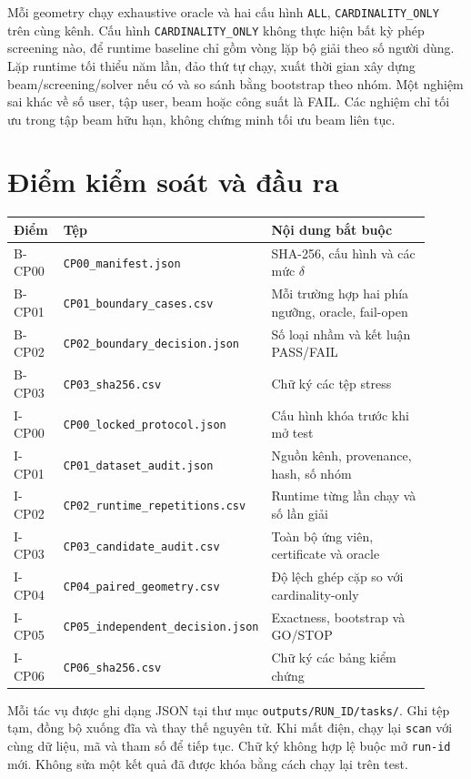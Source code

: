 \documentclass[11pt,onecolumn]{IEEEtran}
\begin{document}
Mỗi geometry chạy exhaustive oracle và hai cấu hình \texttt{ALL}, \texttt{CARDINALITY\_ONLY} trên cùng kênh. Cấu hình \texttt{CARDINALITY\_ONLY} không thực hiện bất kỳ phép screening nào, để runtime baseline chỉ gồm vòng lặp bộ giải theo số người dùng. Lặp runtime tối thiểu năm lần, đảo thứ tự chạy, xuất thời gian xây dựng beam/screening/solver nếu có và so sánh bằng bootstrap theo nhóm. Một nghiệm sai khác về số user, tập user, beam hoặc công suất là FAIL. Các nghiệm chỉ tối ưu trong tập beam hữu hạn, không chứng minh tối ưu beam liên tục.

\section{Điểm kiểm soát và đầu ra}
\begin{longtable}{p{0.12\linewidth}p{0.39\linewidth}p{0.40\linewidth}}
\toprule
Điểm & Tệp & Nội dung bắt buộc\\\midrule
\endhead
B-CP00 & \texttt{CP00\_manifest.json} & SHA-256, cấu hình và các mức $\delta$\\
B-CP01 & \texttt{CP01\_boundary\_cases.csv} & Mỗi trường hợp hai phía ngưỡng, oracle, fail-open\\
B-CP02 & \texttt{CP02\_boundary\_decision.json} & Số loại nhầm và kết luận PASS/FAIL\\
B-CP03 & \texttt{CP03\_sha256.csv} & Chữ ký các tệp stress\\
I-CP00 & \texttt{CP00\_locked\_protocol.json} & Cấu hình khóa trước khi mở test\\
I-CP01 & \texttt{CP01\_dataset\_audit.json} & Nguồn kênh, provenance, hash, số nhóm\\
I-CP02 & \texttt{CP02\_runtime\_repetitions.csv} & Runtime từng lần chạy và số lần giải\\
I-CP03 & \texttt{CP03\_candidate\_audit.csv} & Toàn bộ ứng viên, certificate và oracle\\
I-CP04 & \texttt{CP04\_paired\_geometry.csv} & Độ lệch ghép cặp so với cardinality-only\\
I-CP05 & \texttt{CP05\_independent\_decision.json} & Exactness, bootstrap và GO/STOP\\
I-CP06 & \texttt{CP06\_sha256.csv} & Chữ ký các bảng kiểm chứng\\\bottomrule
\end{longtable}

Mỗi tác vụ được ghi dạng JSON tại thư mục \texttt{outputs/RUN\_ID/tasks/}. Ghi tệp tạm, đồng bộ xuống đĩa và thay thế nguyên tử. Khi mất điện, chạy lại \texttt{scan} với cùng dữ liệu, mã và tham số để tiếp tục. Chữ ký không hợp lệ buộc mở \texttt{run-id} mới. Không sửa một kết quả đã được khóa bằng cách chạy lại trên test.
\end{document}
